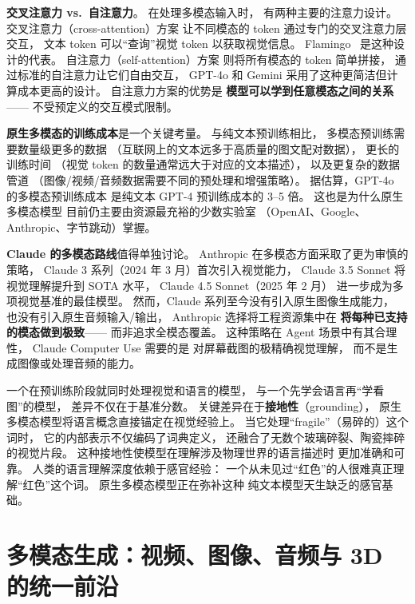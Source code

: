 \textbf{交叉注意力 vs.\ 自注意力}。
在处理多模态输入时，
有两种主要的注意力设计。
交叉注意力（cross-attention）方案
让不同模态的 token 通过专门的交叉注意力层交互，
文本 token 可以“查询”视觉 token 以获取视觉信息。
Flamingo~\cite{alayrac2022flamingo} 是这种设计的代表。
自注意力（self-attention）方案
则将所有模态的 token 简单拼接，
通过标准的自注意力让它们自由交互，
GPT-4o 和 Gemini 采用了这种更简洁但计算成本更高的设计。
自注意力方案的优势是
\textbf{模型可以学到任意模态之间的关系}——
不受预定义的交互模式限制。

\textbf{原生多模态的训练成本}是一个关键考量。
与纯文本预训练相比，
多模态预训练需要数量级更多的数据
（互联网上的文本远多于高质量的图文配对数据），
更长的训练时间
（视觉 token 的数量通常远大于对应的文本描述），
以及更复杂的数据管道
（图像/视频/音频数据需要不同的预处理和增强策略）。
据估算，GPT-4o 的多模态预训练成本
是纯文本 GPT-4 预训练成本的 3--5 倍。
这也是为什么原生多模态模型
目前仍主要由资源最充裕的少数实验室
（OpenAI、Google、Anthropic、字节跳动）掌握。

\textbf{Claude 的多模态路线}值得单独讨论。
Anthropic 在多模态方面采取了更为审慎的策略，
Claude 3 系列（2024 年 3 月）首次引入视觉能力，
Claude 3.5 Sonnet 将视觉理解提升到 SOTA 水平，
Claude 4.5 Sonnet（2025 年 2 月）
进一步成为多项视觉基准的最佳模型。
然而，Claude 系列至今没有引入原生图像生成能力，
也没有引入原生音频输入/输出，
Anthropic 选择将工程资源集中在
\textbf{将每种已支持的模态做到极致}——
而非追求全模态覆盖。
这种策略在 Agent 场景中有其合理性，
Claude Computer Use 需要的是
对屏幕截图的极精确视觉理解，
而不是生成图像或处理音频的能力。

\begin{whybox}[原生多模态为什么重要？]
一个在预训练阶段就同时处理视觉和语言的模型，
与一个先学会语言再“学看图”的模型，
差异不仅在于基准分数。
关键差异在于\textbf{接地性}（grounding），
原生多模态模型将语言概念直接锚定在视觉经验上。
当它处理“fragile”（易碎的）这个词时，
它的内部表示不仅编码了词典定义，
还融合了无数个玻璃碎裂、陶瓷摔碎的视觉片段。
这种接地性使模型在理解涉及物理世界的语言描述时
更加准确和可靠。
人类的语言理解深度依赖于感官经验：
一个从未见过“红色”的人很难真正理解“红色”这个词。
原生多模态模型正在弥补这种
纯文本模型天生缺乏的感官基础。
\end{whybox}


\section{多模态生成：视频、图像、音频与 3D 的统一前沿}
\label{sec:multimodal-generation}

